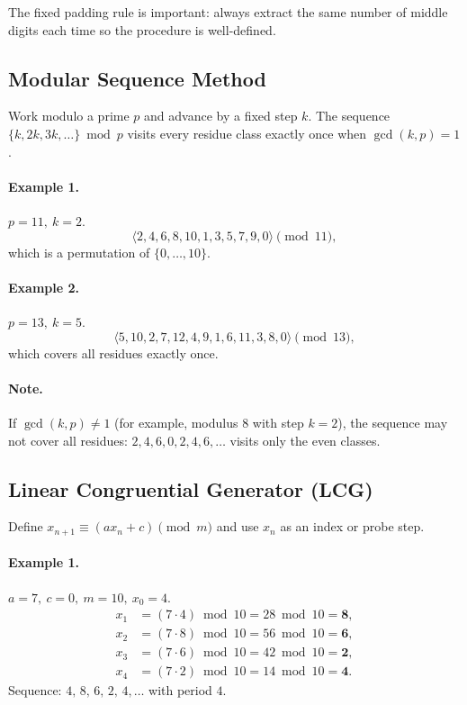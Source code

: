 \documentclass[11pt]{article}
\begin{document}
\vspace{0.75em}



The fixed padding rule is important: always extract the same number of middle digits each time so the procedure is well-defined.

\subsection{Modular Sequence Method}

Work modulo a prime \(p\) and advance by a fixed step \(k\).
The sequence \(\{k,2k,3k,\dots\} \bmod p\) visits every residue class exactly once when \(\gcd(k,p)=1\).

\medskip
\paragraph{Example 1.} \(p=11,\ k=2\).
\[
\langle 2,4,6,8,10,1,3,5,7,9,0\rangle \pmod{11},
\]
which is a permutation of \(\{0,\dots,10\}\).

\medskip
\paragraph{Example 2.} \(p=13,\ k=5\).
\[
\langle 5,10,2,7,12,4,9,1,6,11,3,8,0\rangle \pmod{13},
\]
which covers all residues exactly once.

\medskip
\paragraph{Note.} If \(\gcd(k,p)\neq 1\) (for example, modulus \(8\) with step \(k=2\)),
the sequence may not cover all residues:
\(2,4,6,0,2,4,6,\dots\) visits only the even classes.

\subsection{Linear Congruential Generator (LCG)}
Define \(x_{n+1}\equiv (a x_n + c)\pmod m\) and use \(x_n\) as an index or probe step.

\medskip
\paragraph{Example 1.} \(a=7,\ c=0,\ m=10,\ x_0=4\).
\[
\begin{aligned}
x_1 &= (7\cdot 4)\bmod 10 = 28\bmod 10 = \mathbf{8},\\
x_2 &= (7\cdot 8)\bmod 10 = 56\bmod 10 = \mathbf{6},\\
x_3 &= (7\cdot 6)\bmod 10 = 42\bmod 10 = \mathbf{2},\\
x_4 &= (7\cdot 2)\bmod 10 = 14\bmod 10 = \mathbf{4}.
\end{aligned}
\]
Sequence: \(4,\,8,\,6,\,2,\,4,\dots\) with period \(4\).
\end{document}
